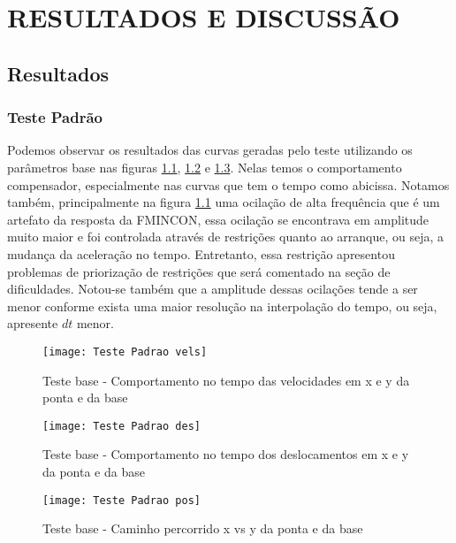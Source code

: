 \chapter{RESULTADOS E DISCUSSÃO}
\section{Resultados}
\subsection{Teste Padrão}
Podemos observar os resultados das curvas geradas pelo teste utilizando os parâmetros base nas figuras
\ref{fig:t_padr_vels}, \ref{fig:t_padr_des} e \ref{fig:t_padr_pos}. Nelas temos o comportamento compensador,
especialmente nas curvas que tem o tempo como abicissa.
Notamos também, principalmente na figura \ref{fig:t_padr_vels} uma ocilação de alta frequência que é um artefato
da resposta da FMINCON, essa ocilação se encontrava em amplitude muito maior e foi controlada através de restrições quanto ao 
arranque, ou seja, a mudança da aceleração no tempo. Entretanto, essa restrição apresentou problemas de priorização
de restrições que será comentado na seção de dificuldades. Notou-se também que a amplitude dessas ocilações tende a ser menor
conforme exista uma maior resolução na interpolação do tempo, ou seja, apresente $dt$ menor.

\begin{figure}[!htb]
    \begin{center}
    \caption{Teste base - Comportamento no tempo das velocidades em x e y da ponta e da base}
    \texttt{[image: Teste Padrao vels]}
    \label{fig:t_padr_vels}
    \end{center}
\end{figure}

\begin{figure}[!htb]
    \begin{center}
    \caption{Teste base - Comportamento no tempo dos deslocamentos em x e y da ponta e da base}
    \texttt{[image: Teste Padrao des]}
    \label{fig:t_padr_des}
    \end{center}
\end{figure}

\begin{figure}[!htb]
    \begin{center}
    \caption{Teste base - Caminho percorrido x vs y da ponta e da base}
    \texttt{[image: Teste Padrao pos]}
    \label{fig:t_padr_pos}
    \end{center}
\end{figure}

